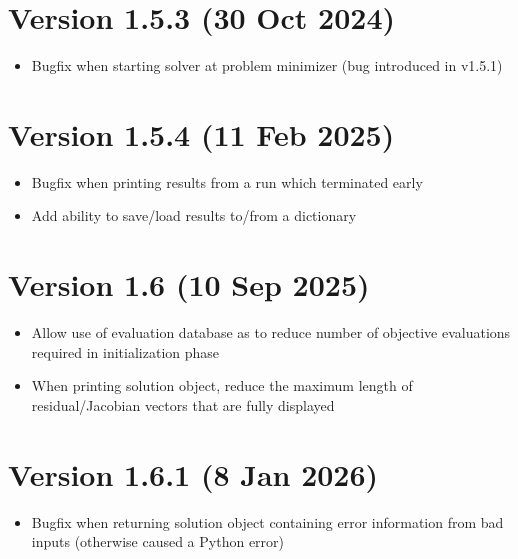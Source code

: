 \documentclass[letterpaper,10pt,english]{sphinxmanual}
\begin{document}
\section{Version 1.5.3 (30 Oct 2024)}
\label{\detokenize{history:version-1-5-3-30-oct-2024}}\begin{itemize}
\item {} 
\sphinxAtStartPar
Bugfix when starting solver at problem minimizer (bug introduced in v1.5.1)

\end{itemize}


\section{Version 1.5.4 (11 Feb 2025)}
\label{\detokenize{history:version-1-5-4-11-feb-2025}}\begin{itemize}
\item {} 
\sphinxAtStartPar
Bugfix when printing results from a run which terminated early

\item {} 
\sphinxAtStartPar
Add ability to save/load results to/from a dictionary

\end{itemize}


\section{Version 1.6 (10 Sep 2025)}
\label{\detokenize{history:version-1-6-10-sep-2025}}\begin{itemize}
\item {} 
\sphinxAtStartPar
Allow use of evaluation database as  to reduce number of objective evaluations required in initialization phase

\item {} 
\sphinxAtStartPar
When printing solution object, reduce the maximum length of residual/Jacobian vectors that are fully displayed

\end{itemize}


\section{Version 1.6.1 (8 Jan 2026)}
\label{\detokenize{history:version-1-6-1-8-jan-2026}}\begin{itemize}
\item {} 
\sphinxAtStartPar
Bugfix when returning solution object containing error information from bad inputs (otherwise caused a Python error)

\end{itemize}
\end{document}
